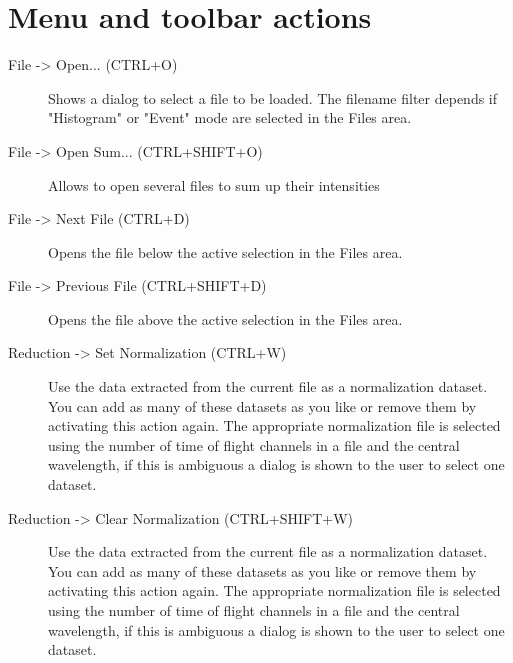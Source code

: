 \section{Menu and toolbar actions}
  
  \begin{description}
   \item[{ File -> Open... (CTRL+O)}] Shows a dialog to select a file to be loaded. The filename filter depends if "Histogram" or "Event" mode are selected in the Files area.
   \item[File -> Open Sum... (CTRL+SHIFT+O)] Allows to open several files to sum up their intensities
   \item[{ File -> Next File (CTRL+D)}] Opens the file below the active selection in the Files area.
   \item[{ File -> Previous File (CTRL+SHIFT+D)}] Opens the file above the active selection in the Files area.
   
   \item[{ Reduction -> Set Normalization (CTRL+W)}] Use the data extracted from the current file as a normalization dataset. You can add as many of these datasets as you like or remove them by activating this action again. The appropriate normalization file is selected using the number of time of flight channels in a file and the central wavelength, if this is ambiguous a dialog is shown to the user to select one dataset.
   \item[{ Reduction -> Clear Normalization (CTRL+SHIFT+W)}] Use the data extracted from the current file as a normalization dataset. You can add as many of these datasets as you like or remove them by activating this action again. The appropriate normalization file is selected using the number of time of flight channels in a file and the central wavelength, if this is ambiguous a dialog is shown to the user to select one dataset.
   

\end{description}
